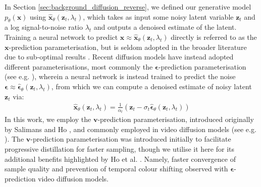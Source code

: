 \documentclass[ oneside,%
                    author={George Herbert},
                    degree={MSci},
                     title={Diffusion Models for Time-Evolving Precipitation Fields},
                  subtitle={}]{dissertation}
\begin{document}
In Section \ref{sec:background_diffusion_reverse}, we defined our generative model $p_\theta(\mathbf{x})$ using $\hat{\mathbf{x}}_\theta(\mathbf{z}_t,\lambda_t)$, which takes as input some noisy latent variable $\mathbf{z}_t$ and a log signal-to-noise ratio $\lambda_t$ and outputs a denoised estimate of the latent. Training a neural network to predict $\mathbf{x}\approx\hat{\mathbf{x}}_\theta(\mathbf{z}_t, \lambda_t)$ directly is referred to as the $\mathbf{x}$-prediction parameterisation, but is seldom adopted in the broader literature due to sub-optimal results \cite{DDPM_Ho}. Recent diffusion models have instead adopted different parameterisations, most commonly the $\boldsymbol\epsilon$-prediction parameterisation (see e.g. \cite{DDPM_Ho,Cascaded_Ho,Imagen_Saharia}), wherein a neural network is instead trained to predict the noise $\boldsymbol\epsilon\approx\hat{\boldsymbol\epsilon}_\theta(\mathbf{z}_t,\lambda_t)$, from which we can compute a denoised estimate of noisy latent $\mathbf{z}_t$ via:
\begin{align}
      \hat{\mathbf{x}}_\theta(\mathbf{z}_t,\lambda_t)=\frac{1}{\alpha_t}\left(\mathbf{z}_t-\sigma_t\hat{\boldsymbol\epsilon}_\theta(\mathbf{z}_t, \lambda_t)\right)
\end{align}
In this work, we employ the $\mathbf{v}$-prediction parameterisation, introduced originally by Salimans and Ho \cite{Progressive_Distillation_Salimans}, and commonly employed in video diffusion models (see e.g. \cite{VDM_Ho,Imagen_Video_Ho}). The $\mathbf{v}$-prediction parameterisation was introduced initially to facilitate progressive distillation for faster sampling, though we utilise it here for its additional benefits highlighted by Ho et al. \cite{Imagen_Video_Ho}. Namely, faster convergence of sample quality and prevention of temporal colour shifting observed with $\boldsymbol\epsilon$-prediction video diffusion models. 
\end{document}
